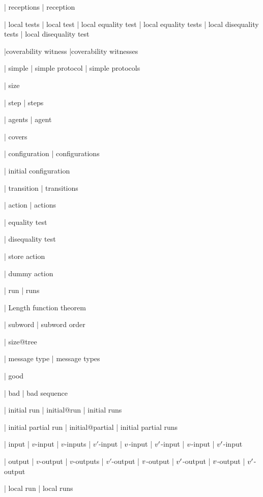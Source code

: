 | receptions
| reception

| local tests
| local test
| local equality test
| local equality tests
| local disequality tests
| local disequality test

|coverability witness
|coverability witnesses

| simple
| simple protocol
| simple protocols

| size

| step
| steps

| agents
| agent

| covers

| configuration
| configurations

| initial configuration

| transition
| transitions

| action
| actions

| equality test

| disequality test

| store action

| dummy action


| run
| runs

| Length function theorem

| subword 
| subword order


| size@tree 

| message type
| message types

| good

| bad
| bad sequence

| initial run
| initial@run
| initial runs

| initial partial run
| initial@partial
| initial partial runs

| input
| $v$-input
| $v$-inputs
| $v'$-input
| $v$-input
| $v'$-input
| $v$-input
| $v'$-input

| output
| $v$-output
| $v$-outputs
| $v'$-output
| $v$-output
| $v'$-output
| $v$-output
| $v'$-output

| local run
| local runs

